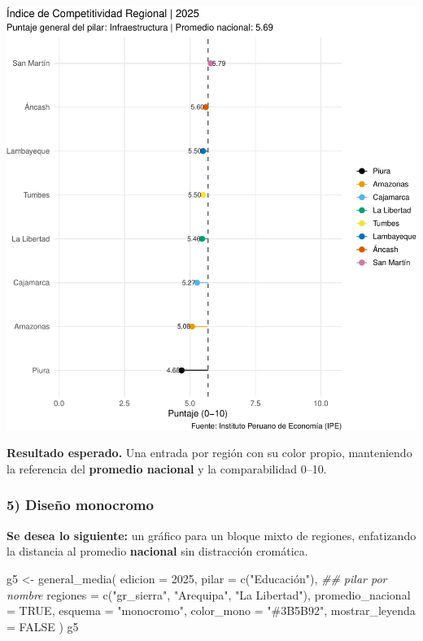 \documentclass[
  11pt,
  letterpaper,
  DIV=11,
  numbers=noendperiod]{scrartcl}
\newenvironment{Shaded}{\begin{snugshade}}{\end{snugshade}}
\newcommand{\AttributeTok}[1]{\textcolor[rgb]{0.40,0.45,0.13}{#1}}
\newcommand{\ConstantTok}[1]{\textcolor[rgb]{0.56,0.35,0.01}{#1}}
\newcommand{\DecValTok}[1]{\textcolor[rgb]{0.68,0.00,0.00}{#1}}
\newcommand{\DocumentationTok}[1]{\textcolor[rgb]{0.37,0.37,0.37}{\textit{#1}}}
\newcommand{\FunctionTok}[1]{\textcolor[rgb]{0.28,0.35,0.67}{#1}}
\newcommand{\NormalTok}[1]{\textcolor[rgb]{0.00,0.23,0.31}{#1}}
\newcommand{\OtherTok}[1]{\textcolor[rgb]{0.00,0.23,0.31}{#1}}
\newcommand{\StringTok}[1]{\textcolor[rgb]{0.13,0.47,0.30}{#1}}
\begin{document}
\includegraphics{Manual_files/figure-pdf/unnamed-chunk-50-1.pdf}

\textbf{Resultado esperado.} Una entrada por región con su color propio,
manteniendo la referencia del \textbf{promedio nacional} y la
comparabilidad 0--10.

\subsubsection{\texorpdfstring{\textbf{5) Diseño
monocromo}}{5) Diseño monocromo}}\label{diseuxf1o-monocromo}

\textbf{Se desea lo siguiente:} un gráfico para un bloque mixto de
regiones, enfatizando la distancia al promedio \textbf{nacional} sin
distracción cromática.

\begin{Shaded}
\begin{Highlighting}[]
\NormalTok{g5 }\OtherTok{\textless{}{-}} \FunctionTok{general\_media}\NormalTok{(}
  \AttributeTok{edicion =} \DecValTok{2025}\NormalTok{,}
  \AttributeTok{pilar   =} \FunctionTok{c}\NormalTok{(}\StringTok{"Educación"}\NormalTok{),   }\DocumentationTok{\#\# pilar por nombre}
  \AttributeTok{regiones =} \FunctionTok{c}\NormalTok{(}\StringTok{"gr\_sierra"}\NormalTok{, }\StringTok{"Arequipa"}\NormalTok{, }\StringTok{"La Libertad"}\NormalTok{),}
  \AttributeTok{promedio\_nacional =} \ConstantTok{TRUE}\NormalTok{,}
  \AttributeTok{esquema =} \StringTok{"monocromo"}\NormalTok{,}
  \AttributeTok{color\_mono =} \StringTok{"\#3B5B92"}\NormalTok{,}
  \AttributeTok{mostrar\_leyenda =} \ConstantTok{FALSE}
\NormalTok{)}
\NormalTok{g5}
\end{Highlighting}
\end{Shaded}
\end{document}
